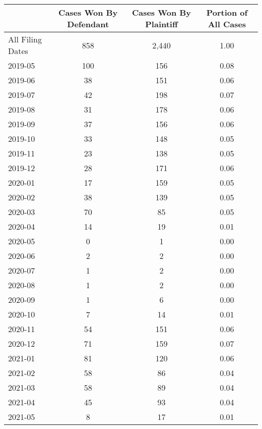 \begin{tabular}{lccc}
\toprule
 & Cases Won By Defendant & Cases Won By Plaintiff & Portion of All Cases \\
\midrule
All Filing Dates & 858 & 2,440 & 1.00 \\
2019-05 & 100 & 156 & 0.08 \\
2019-06 & 38 & 151 & 0.06 \\
2019-07 & 42 & 198 & 0.07 \\
2019-08 & 31 & 178 & 0.06 \\
2019-09 & 37 & 156 & 0.06 \\
2019-10 & 33 & 148 & 0.05 \\
2019-11 & 23 & 138 & 0.05 \\
2019-12 & 28 & 171 & 0.06 \\
2020-01 & 17 & 159 & 0.05 \\
2020-02 & 38 & 139 & 0.05 \\
2020-03 & 70 & 85 & 0.05 \\
2020-04 & 14 & 19 & 0.01 \\
2020-05 & 0 & 1 & 0.00 \\
2020-06 & 2 & 2 & 0.00 \\
2020-07 & 1 & 2 & 0.00 \\
2020-08 & 1 & 2 & 0.00 \\
2020-09 & 1 & 6 & 0.00 \\
2020-10 & 7 & 14 & 0.01 \\
2020-11 & 54 & 151 & 0.06 \\
2020-12 & 71 & 159 & 0.07 \\
2021-01 & 81 & 120 & 0.06 \\
2021-02 & 58 & 86 & 0.04 \\
2021-03 & 58 & 89 & 0.04 \\
2021-04 & 45 & 93 & 0.04 \\
2021-05 & 8 & 17 & 0.01 \\
\bottomrule
\end{tabular}
